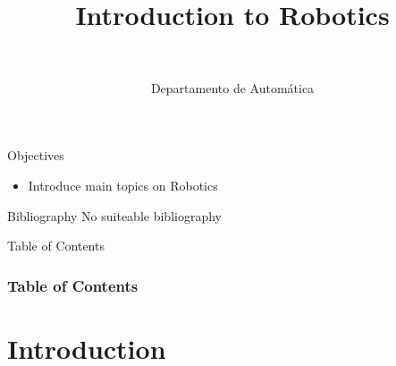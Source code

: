 \documentclass[10pt,compress]{beamer} %
\title[Introduction to Robotics]{Introduction to Robotics}
\author{\asignatura\\\carrera}
\institute{}
\date{Departamento de Automática}
\begin{document}
{\titlepageBlue
    \begin{frame}
        \titlepage
    \end{frame}
}

\institute{\asignatura}

\begin{frame}[plain]{}
   \begin{block}{Objectives}
       \begin{itemize}
        \item Introduce main topics on Robotics
       \end{itemize}
   \end{block}

   \begin{block}{Bibliography}
       No suiteable bibliography
   \end{block}
\end{frame}

{
\begin{frame}[shrink]{Table of Contents}
 \frametitle{Table of Contents}
 \tableofcontents
\end{frame}
}

\section{Introduction}
\end{document}
